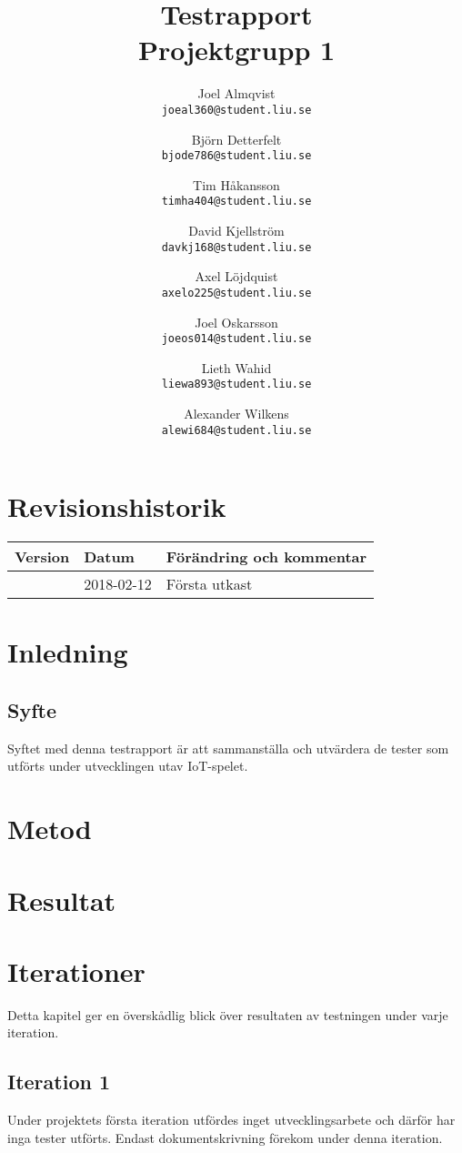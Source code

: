 \documentclass[10pt]{article}
\title{Testrapport\\
    \large Projektgrupp 1}
\author{
    Joel Almqvist\\
    \texttt{joeal360@student.liu.se}
    \and
    Björn Detterfelt\\
    \texttt{bjode786@student.liu.se}
    \and
    Tim Håkansson\\
    \texttt{timha404@student.liu.se}
    \and
    David Kjellström\\
    \texttt{davkj168@student.liu.se}
    \and
    Axel Löjdquist\\
    \texttt{axelo225@student.liu.se}
    \and
    Joel Oskarsson\\
    \texttt{joeos014@student.liu.se}
    \and
    Lieth Wahid\\
    \texttt{liewa893@student.liu.se}
    \and
    Alexander Wilkens\\
    \texttt{alewi684@student.liu.se}
}
\begin{document}



\maketitle
\pagebreak
	\section*{Revisionshistorik}

	
	\begin{center}
 	   \begin{tabular}{| l | l | p{12cm} |  }
 	       \hline
 	       \textbf{Version} & \textbf{Datum} & \textbf{Förändring och kommentar} \\
 	       \hline
 	       \centering 0.1 & 2018-02-12 & Första utkast\\
		\hline
 	   \end{tabular}
	\end{center}

	
	
\pagebreak
\tableofcontents
\pagebreak
{}

\section{Inledning}

\subsection{Syfte}
Syftet med denna testrapport är att sammanställa och utvärdera de tester som utförts under utvecklingen utav IoT-spelet. 
  

\section{Metod}

\section{Resultat}
\section{Iterationer}
Detta kapitel ger en överskådlig blick över resultaten av testningen under varje iteration.
\subsection{Iteration 1}
Under projektets första iteration utfördes inget utvecklingsarbete och därför har inga tester utförts. Endast dokumentskrivning förekom under denna iteration.
\end{document}
